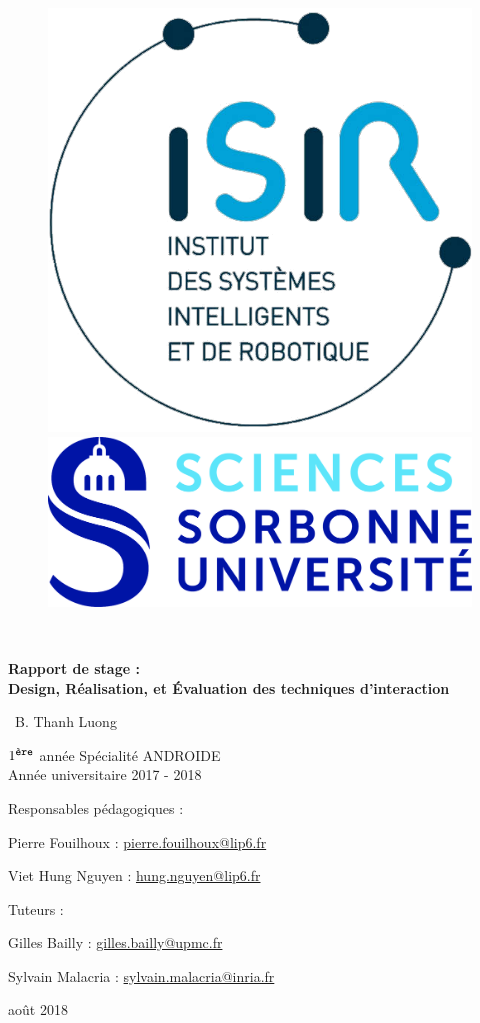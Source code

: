 \documentclass[12pt,a4paper]{article}
\begin{document}
\begin{titlepage}
	\begin{figure}
	\centering
	\begin{minipage}{.5\textwidth}
  	\includegraphics[width=.5\linewidth]{ISIR.png}
	\end{minipage}%
	\begin{minipage}{.5\textwidth}
  	\centering
  	\includegraphics[width=.8\linewidth]{SU.jpg}
	\end{minipage}
	\end{figure}
	\centering
	\par
	{\scshape\large \  \par}
	\vspace{2.5cm}
	{\huge\bfseries Rapport de stage :\\
		Design, Réalisation, et Évaluation des techniques d'interaction\par}
	\vspace{2cm}
	{\Large\ B. Thanh Luong \par}
	\vspace{0.5cm}
	{$1^{\texttt{\footnotesize ère}}$ année Spécialité ANDROIDE\\}
	{Année universitaire 2017 - 2018}
	\vfill
	\begin{minipage}{.5\textwidth}
	\centering
  	Responsables pédagogiques :\par
	Pierre Fouilhoux : \href{mailto:pierre.fouilhoux@lip6.fr}{pierre.fouilhoux@lip6.fr}\par
	Viet Hung Nguyen : \href{mailto:hung.nguyen@lip6.fr}{hung.nguyen@lip6.fr}\par
	\end{minipage}%
	\begin{minipage}{.5\textwidth}
  	\centering
  	Tuteurs :\par
	Gilles Bailly : \href{mailto:gilles.bailly@upmc.fr}{gilles.bailly@upmc.fr}\par
	Sylvain Malacria : \href{mailto:sylvain.malacria@inria.fr}{sylvain.malacria@inria.fr}
	\end{minipage}
	\vfill

	{\large août 2018\par}
\end{titlepage}
\end{document}
